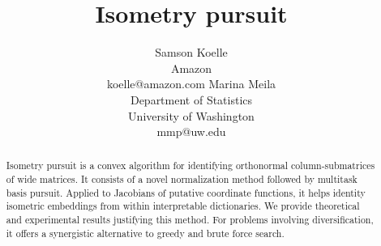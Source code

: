 \documentclass{article}
\title{Isometry pursuit}
\author{%
  Samson Koelle \\
  Amazon  \\
  koelle@amazon.com
  \And
  Marina Meila \\
  Department of Statistics\\
  University of Washington \\
  mmp@uw.edu
}
\begin{document}
\maketitle

\begin{abstract}
Isometry pursuit is a convex algorithm for identifying orthonormal column-submatrices of wide matrices.
It consists of a novel normalization method followed by multitask basis pursuit.
Applied to Jacobians of putative coordinate functions, it helps identity isometric embeddings from within interpretable dictionaries.
We provide theoretical and experimental results justifying this method.
For problems involving diversification, it offers a synergistic alternative to greedy and brute force search.
\end{abstract}











\end{document}

